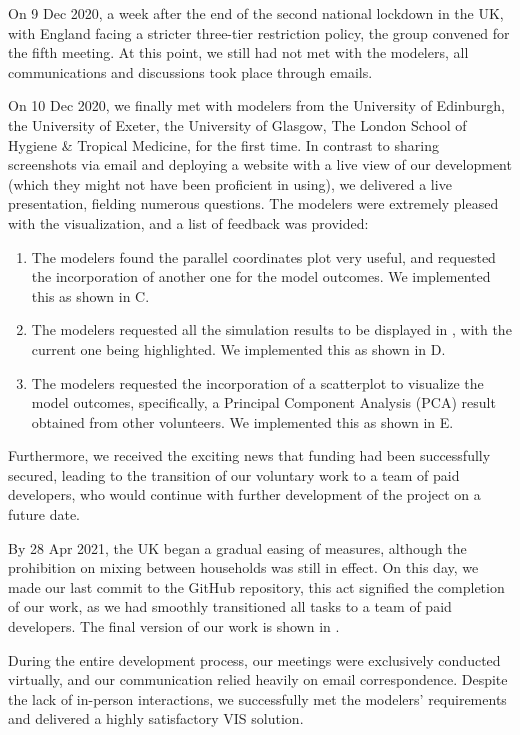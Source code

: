 
On 9 Dec 2020, a week after the end of the second national lockdown in the UK, with England facing a stricter three-tier restriction policy, the group convened for the fifth meeting.
At this point, we still had not met with the modelers, all communications and discussions took place through emails.


On 10 Dec 2020, we finally met with modelers from the University of Edinburgh, the University of Exeter, the University of Glasgow, The London School of Hygiene \& Tropical Medicine, for the first time.
In contrast to sharing screenshots via email and deploying a website with a live view of our development (which they might not have been proficient in using), we delivered a live presentation, fielding numerous questions.
The modelers were extremely pleased with the visualization, and a list of feedback was provided:
\begin{enumerate}
    \item The modelers found the parallel coordinates plot very useful, and requested the incorporation of another one for the model outcomes. We implemented this as shown in C.
    \item The modelers requested all the simulation results to be displayed in , with the current one being highlighted. We implemented this as shown in D.
    \item The modelers requested the incorporation of a scatterplot to visualize the model outcomes, specifically, a Principal Component Analysis (PCA) result obtained from other volunteers. We implemented this as shown in E.
\end{enumerate}

Furthermore, we received the exciting news that funding had been successfully secured, leading to the transition of our voluntary work to a team of paid developers, who would continue with further development of the project on a future date.


By 28 Apr 2021, the UK began a gradual easing of measures, although the prohibition on mixing between households was still in effect.
On this day, we made our last commit to the GitHub repository, this act signified the completion of our work, as we had smoothly transitioned all tasks to a team of paid developers.
The final version of our work is shown in .

During the entire development process, our meetings were exclusively conducted virtually, and our communication relied heavily on email correspondence.
Despite the lack of in-person interactions, we successfully met the modelers' requirements and delivered a highly satisfactory \ac{VIS} solution.
